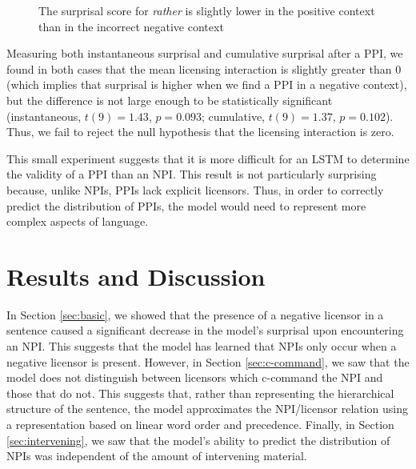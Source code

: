 \documentclass[11pt, round]{article}
\begin{document}
\begin{figure}
    \centering
     \caption{The surprisal score for \textit{rather} is slightly lower in the positive context than in the incorrect negative context}
    \label{fig:ppi-basic-licensing}
\end{figure}

Measuring both instantaneous surprisal and cumulative surprisal after a PPI, we found in both cases that the mean licensing interaction is slightly greater than 0 (which implies that surprisal is higher when we find a PPI in a negative context), but the difference is not large enough to be statistically significant (instantaneous, $t(9) = 1.43$, $p = 0.093$; cumulative, $t(9) = 1.37$, $p = 0.102$). Thus, we fail to reject the null hypothesis that the licensing interaction is zero.

This small experiment suggests that it is more difficult for an LSTM to determine the validity of a PPI than an NPI. This result is not particularly surprising because, unlike NPIs, PPIs lack explicit licensors. Thus, in order to correctly predict the distribution of PPIs, the model would need to represent more complex aspects of language.

\section{Results and Discussion}

In Section \ref{sec:basic}, we showed that the presence of a negative licensor in a sentence caused a significant decrease in the model's surprisal upon encountering an NPI. This suggests that the model has learned that NPIs only occur when a negative licensor is present. However, in Section \ref{sec:c-command}, we saw that the model does not distinguish between licensors which c-command the NPI and those that do not. This suggests that, rather than representing the hierarchical structure of the sentence, the model approximates the NPI/licensor relation using a representation based on linear word order and precedence. Finally, in Section \ref{sec:intervening}, we saw that the model's ability to predict the distribution of NPIs was independent of the amount of intervening material.
\end{document}
